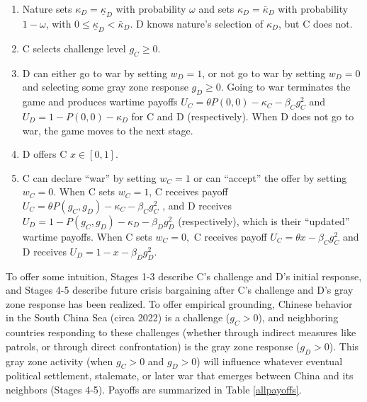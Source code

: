 \documentclass[11pt,letterpaper,pdftex,dvipsnames,table]{article}
\begin{document}
\begin{enumerate}
    \item Nature sets $\kappa_{D}=\underline{\kappa}_{D}$ with probability $\omega$ and sets $\kappa_{D}=\bar{\kappa}_{D}$ with probability $1-\omega$, with $0\leq\underline{\kappa}_{D}<\bar{\kappa}_{D}$. D knows nature's selection of $\kappa_{D}$, but C does not. 
    \item C selects  challenge level $g_{C}\geq0$. 
    \item D can either go to war by setting $w_{D}=1$, or not go to war by setting $w_{D}=0$ and selecting some gray zone response $g_{D}\geq0$. Going to war terminates the game and produces wartime payoffs $U_{C}=\theta P(0,0)-\kappa_{C}-\beta_{C}g_{C}^{2}$ and $U_{D}=1-P(0,0)-\kappa_{D}$ for C and D (respectively). When D does not go to war, the game moves to the next stage. 
    \item D offers C $x\in[0,1]$. 
    \item C can declare ``war'' by setting $w_{C}=1$ or can ``accept'' the offer by setting $w_{C}=0$. When C sets $w_{C}=1$, C receives payoff $U_{C}=\theta P(g_{C},g_{D})-\kappa_{C}-\beta_{C}g_{C}^{2}$ , and D receives $U_{D}=1-P(g_{C},g_{D})-\kappa_{D}-\beta_{D}g_{D}^{2}$ (respectively), which is their ``updated'' wartime payoffs. When C sets $w_{C}=0,$ C receives payoff $U_{C}=\theta x-\beta_{C}g_{C}^{2}$ and D receives $U_{D}=1-x-\beta_{D}g_{D}^{2}$. 
\end{enumerate}

To offer some intuition, Stages 1-3 describe C's challenge and D's initial response, and Stages 4-5 describe future crisis bargaining after C's challenge and D's gray zone response has been realized. To offer empirical grounding, Chinese behavior in the South China Sea (circa 2022) is a challenge ($g_{C}>0$), and neighboring countries responding to these challenges (whether through indirect measures like patrols, or through direct confrontation) is the gray zone response ($g_{D}>0$). This gray zone activity (when $g_{C}>0$ and $g_{D}>0$) will influence whatever eventual political settlement, stalemate, or later war that emerges between China and its neighbors (Stages 4-5). Payoffs are summarized in Table \ref{allpayoffs}.
\end{document}
